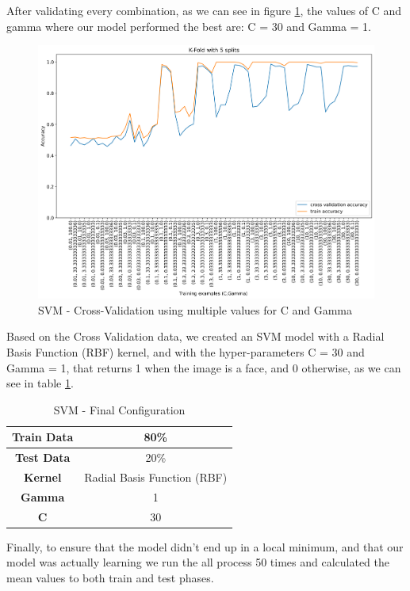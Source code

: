 After validating every combination, as we can see in figure \ref{fig:svm-cross-validation}, the values of C and gamma where our model performed the best are: C = 30 and Gamma = 1.

\begin{figure}[htbp]
\centerline{\includegraphics[width=1\linewidth]{images/svm_cross_validation.png}}
\caption{SVM - Cross-Validation using multiple values for C and Gamma}
\label{fig:svm-cross-validation}
\end{figure}

Based on the Cross Validation data, we created an SVM model with a Radial Basis Function (RBF) kernel, and with the hyper-parameters C = 30 and Gamma = 1, that returns 1 when the image is a face, and 0 otherwise, as we can see in table \ref{table:svm-final-configuration}.

\begin{table}[htbp]
\centering
\caption{SVM - Final Configuration}
\begin{tabular}{ |c|c| } 
 \hline
 \textbf{Train Data} & 80\% \\ 
 \hline
 \textbf{Test Data} & 20\% \\ 
 \hline
 \textbf{Kernel} &  Radial Basis Function (RBF) \\ 
 \hline
 \textbf{Gamma} & 1 \\ 
 \hline
 \textbf{C} & 30 \\ 
 \hline
\end{tabular}
\label{table:svm-final-configuration}
\end{table}

Finally, to ensure that the model didn't end up in a local minimum, and that our model was actually learning we run the all process 50 times and calculated the mean values to both train and test phases.
